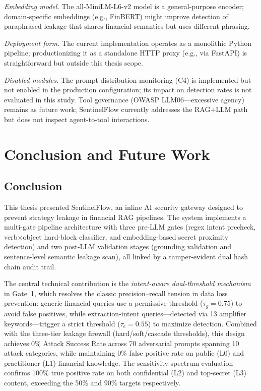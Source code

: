 \documentclass[journal,12pt,onecolumn,draftclsnofoot]{IEEEtran}
\begin{document}
\textit{Embedding model.} The all-MiniLM-L6-v2 model is a general-purpose encoder; domain-specific embeddings (e.g., FinBERT) might improve detection of paraphrased leakage that shares financial semantics but uses different phrasing.

\textit{Deployment form.} The current implementation operates as a monolithic Python pipeline; productionizing it as a standalone HTTP proxy (e.g., via FastAPI) is straightforward but outside this thesis scope.

\textit{Disabled modules.} The prompt distribution monitoring (C4) is implemented but not enabled in the production configuration; its impact on detection rates is not evaluated in this study. Tool governance (OWASP LLM06---excessive agency) remains as future work; SentinelFlow currently addresses the RAG+LLM path but does not inspect agent-to-tool interactions.

\section{Conclusion and Future Work}
\label{Sect:Conclusion}

\subsection{Conclusion}

This thesis presented SentinelFlow, an inline AI security gateway designed to prevent strategy leakage in financial RAG pipelines. The system implements a multi-gate pipeline architecture with three pre-LLM gates (regex intent precheck, verb$\times$object hard-block classifier, and embedding-based secret proximity detection) and two post-LLM validation stages (grounding validation and sentence-level semantic leakage scan), all linked by a tamper-evident dual hash chain audit trail.

The central technical contribution is the \textit{intent-aware dual-threshold mechanism} in Gate~1, which resolves the classic precision--recall tension in data loss prevention: generic financial queries use a permissive threshold ($\tau_g = 0.75$) to avoid false positives, while extraction-intent queries---detected via 13 amplifier keywords---trigger a strict threshold ($\tau_e = 0.55$) to maximize detection. Combined with the three-tier leakage firewall (hard/soft/cascade thresholds), this design achieves 0\% Attack Success Rate across 70 adversarial prompts spanning 10 attack categories, while maintaining 0\% false positive rate on public (L0) and practitioner (L1) financial knowledge. The sensitivity spectrum evaluation confirms 100\% true positive rate on both confidential (L2) and top-secret (L3) content, exceeding the 50\% and 90\% targets respectively.
\end{document}
